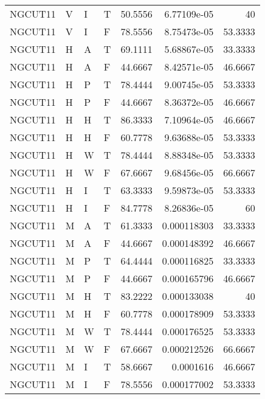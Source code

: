 \begin{longtable}{llllrrr}
    NGCUT11  & V     & I     & T          & 50.5556    & 6.77109e-05 & 40       \\
    NGCUT11  & V     & I     & F          & 78.5556    & 8.75473e-05 & 53.3333  \\
    NGCUT11  & H     & A     & T          & 69.1111    & 5.68867e-05 & 33.3333  \\
    NGCUT11  & H     & A     & F          & 44.6667    & 8.42571e-05 & 46.6667  \\
    NGCUT11  & H     & P     & T          & 78.4444    & 9.00745e-05 & 53.3333  \\
    NGCUT11  & H     & P     & F          & 44.6667    & 8.36372e-05 & 46.6667  \\
    NGCUT11  & H     & H     & T          & 86.3333    & 7.10964e-05 & 46.6667  \\
    NGCUT11  & H     & H     & F          & 60.7778    & 9.63688e-05 & 53.3333  \\
    NGCUT11  & H     & W     & T          & 78.4444    & 8.88348e-05 & 53.3333  \\
    NGCUT11  & H     & W     & F          & 67.6667    & 9.68456e-05 & 66.6667  \\
    NGCUT11  & H     & I     & T          & 63.3333    & 9.59873e-05 & 53.3333  \\
    NGCUT11  & H     & I     & F          & 84.7778    & 8.26836e-05 & 60       \\
    NGCUT11  & M     & A     & T          & 61.3333    & 0.000118303 & 33.3333  \\
    NGCUT11  & M     & A     & F          & 44.6667    & 0.000148392 & 46.6667  \\
    NGCUT11  & M     & P     & T          & 64.4444    & 0.000116825 & 33.3333  \\
    NGCUT11  & M     & P     & F          & 44.6667    & 0.000165796 & 46.6667  \\
    NGCUT11  & M     & H     & T          & 83.2222    & 0.000133038 & 40       \\
    NGCUT11  & M     & H     & F          & 60.7778    & 0.000178909 & 53.3333  \\
    NGCUT11  & M     & W     & T          & 78.4444    & 0.000176525 & 53.3333  \\
    NGCUT11  & M     & W     & F          & 67.6667    & 0.000212526 & 66.6667  \\
    NGCUT11  & M     & I     & T          & 58.6667    & 0.0001616   & 46.6667  \\
    NGCUT11  & M     & I     & F          & 78.5556    & 0.000177002 & 53.3333  \\

\end{longtable}
